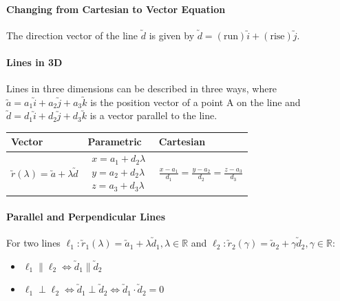 \documentclass[a4paper,twoside]{article}
\begin{document}
			\paragraph{Changing from Cartesian to Vector Equation} The direction vector of the line $\utilde{d}$ is given by $\utilde{d}=\mathrm{(run)}\utilde{i}+\mathrm{(rise)}\utilde{j}$.
			
			\paragraph{Lines in 3D} Lines in three dimensions can be described in three ways, where $\utilde{a}=a_1\utilde{i}+a_2\utilde{j}+a_3\utilde{k}$ is the position vector of a point A on the line and $\utilde{d}=d_1\utilde{i}+d_2\utilde{j}+d_3\utilde{k}$ is a vector parallel to the line.
			\begin{center}
				\bgroup
				\def\arraystretch{2}
				\begin{tabularx}{\textwidth}{|m{3cm}*2{|X}|}
					\hline
					\centering Vector & Parametric & Cartesian \\
					\hline
					\vspace{2em}
					\centering$\utilde{r}(\lambda)=\utilde{a}+\lambda\utilde{d}$ & $\begin{aligned}
						x=a_1+d_2\lambda \\[1em]
						y=a_2+d_2\lambda \\[1em]
						z=a_3+d_3\lambda
					\end{aligned}$ & \(\frac{x-a_1}{d_1}=\frac{y-a_2}{d_2}=\frac{z-a_3}{d_3}\) \\
					\hline
				\end{tabularx}
				\egroup
			\end{center}
			
			\paragraph{Parallel and Perpendicular Lines} For two lines $\ell_1:\utilde{r}_1(\lambda)=\utilde{a}_1+\lambda\utilde{d}_1,\lambda\in\mathbb{R}$ and $\ell_2:\utilde{r}_2(\gamma)=\utilde{a}_2+\gamma\utilde{d}_2,\gamma\in\mathbb{R}$:
			\begin{itemize}
				\item $\ell_1\parallel\ell_2 \iff \utilde{d}_1\parallel\utilde{d}_2$
				\item $\ell_1\perp\ell_2 \iff \utilde{d}_1\perp\utilde{d}_2 \iff \utilde{d}_1\cdot\utilde{d}_2=0$
			\end{itemize}
			
\end{document}

